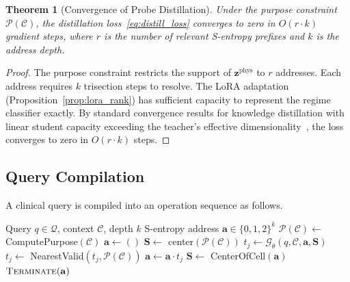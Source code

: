 \documentclass[aps,prd,twocolumn,superscriptaddress,floatfix,nofootinbib]{revtex4-2}
\newtheorem{theorem}{Theorem}[section]
\theoremstyle{remark}
\newcommand{\Svec}{\mathbf{S}}
\newcommand{\Purpose}{\mathcal{P}}
\newcommand{\Context}{\mathcal{C}}
\newcommand{\Probe}{\mathcal{G}}
\begin{document}
\begin{theorem}[Convergence of Probe Distillation]
\label{thm:distill_convergence}
Under the purpose constraint $\Purpose(\Context)$, the distillation loss~\eqref{eq:distill_loss} converges to zero in $O(r \cdot k)$ gradient steps, where $r$ is the number of relevant S-entropy prefixes and $k$ is the address depth.
\end{theorem}

\begin{proof}
The purpose constraint restricts the support of $\mathbf{z}^{\mathrm{phys}}$ to $r$ addresses.
Each address requires $k$ trisection steps to resolve.
The LoRA adaptation (Proposition~\ref{prop:lora_rank}) has sufficient capacity to represent the regime classifier exactly.
By standard convergence results for knowledge distillation with linear student capacity exceeding the teacher's effective dimensionality~\cite{hinton2015distilling,ba2014deep}, the loss converges to zero in $O(r \cdot k)$ steps.
\end{proof}

\subsection{Query Compilation}

A clinical query is compiled into an operation sequence as follows.

\begin{algorithm}[!htbp]
\caption{Query Compilation via Compiled Probe}
\label{alg:query_compile}
\begin{algorithmic}[1]
\Require Query $q \in \mathcal{Q}$, context $\Context$, depth $k$
\Ensure S-entropy address $\mathbf{a} \in \{0,1,2\}^k$
\State $\Purpose(\Context) \gets$ ComputePurpose$(\Context)$
\State $\mathbf{a} \gets ()$
\State $\Svec \gets$ center$(\Purpose(\Context))$
    \State $t_j \gets \Probe_\theta(q, \Context, \mathbf{a}, \Svec)$
    \If{$t_j \notin \Purpose(\Context)$}
        \State $t_j \gets$ NearestValid$(t_j, \Purpose(\Context))$
    \EndIf
    \State $\mathbf{a} \gets \mathbf{a} \cdot t_j$
    \State $\Svec \gets$ CenterOfCell$(\mathbf{a})$
\EndFor
\State \Return $\textsc{Terminate}(\mathbf{a})$
\end{algorithmic}
\end{algorithm}
\end{document}
